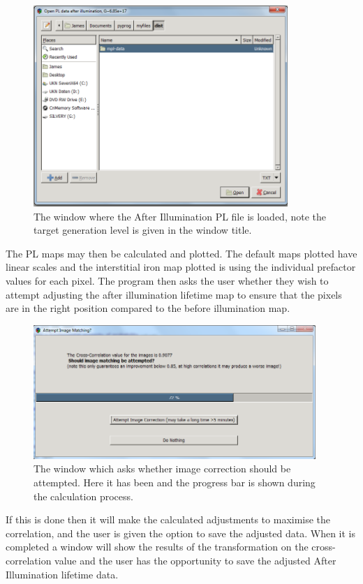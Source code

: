 \documentclass[final,a4paper,oneside,12pt]{article}
\begin{document}
\begin{figure}[h!]
\includegraphics[height=3in]{2loadplafterfile} 
\caption{\label{figure2} The window where the After Illumination PL file is loaded, note the target generation level is given in the window title.}
\end{figure}

\pagebreak
 The PL maps may then be calculated and plotted. The default maps plotted have linear scales and the interstitial iron map plotted is using the individual prefactor values for each pixel. The program then asks the user whether they wish to attempt adjusting the after illumination lifetime map to ensure that the pixels are in the right position compared to the before illumination map. 

\begin{figure}[h!]
\includegraphics[height=2in]{2attemptcorrection}
\caption{\label{figure2} The window which asks whether image correction should be attempted. Here it has been and the progress bar is shown during the calculation process.}
\end{figure}

If this is done then it will make the calculated adjustments to maximise the correlation, and the user is given the option to save the adjusted data. When it is completed a window will show the results of the transformation on the cross-correlation value and the user has the opportunity to save the adjusted After Illumination lifetime data.
\end{document}
